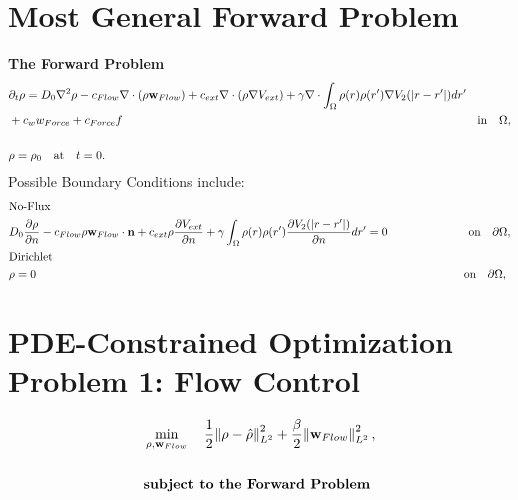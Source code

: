\documentclass[11pt, a4paper]{article}
\theoremstyle{definition}
\begin{document}
	
\section*{Most General Forward Problem}	
\textbf{The Forward Problem}
\begin{align*}
&\partial_t \rho = D_0\nabla^2 \rho - c_{Flow}\nabla \cdot (\rho \mathbf{w}_{Flow}) + c_{ext}\nabla \cdot (\rho \nabla V_{ext}) + \gamma\nabla \cdot \int_\Omega \rho(r) \rho(r') \nabla V_2(|r-r'|) dr' \\
&+c_{{w}}{w}_{Force} +c_{Force} f\quad \qquad\qquad\qquad\qquad\qquad\qquad\qquad\qquad\qquad\qquad\qquad\qquad\qquad\qquad \quad\text{in} \quad \Omega,\notag\\
\notag\\
& \rho = \rho_0 \quad \text{at} \quad t=0.  \notag
\end{align*}
Possible Boundary Conditions include:
\begin{align*}
&\text{No-Flux}\\
&D_0\dfrac{\partial \rho}{\partial n} - c_{Flow}\rho \mathbf{w}_{Flow} \cdot \mathbf{n} +c_{ext} \rho \dfrac{\partial V_{ext}}{\partial n} + \gamma \int_\Omega \rho(r) \rho(r') \frac{\partial V_2(|r-r'|)}{\partial n} dr'  =0 \quad\quad \quad \quad \quad \quad \quad \text{on} \quad \partial \Omega,\notag \\
&\text{Dirichlet}\\
&\rho =0 \quad\quad \quad \quad \quad \quad \quad \qquad \qquad\qquad\qquad\qquad\qquad\qquad\qquad\qquad\qquad\qquad\qquad\qquad\qquad\qquad \text{on} \quad \partial \Omega,\notag
\end{align*}
\section*{PDE-Constrained Optimization Problem 1: Flow Control}
\begin{align*}
&\min_{\rho,\mathbf{w}_{Flow}} \quad \frac{1}{2}\norm{\rho- \hat{\rho}}_{L^2}^2 + \frac{\beta}{2} \norm{\mathbf{w}_{Flow}}_{L^2}^2,\\
\notag\\
&\textbf{subject to the Forward Problem}\notag\\ 
\end{align*}
\end{document}
